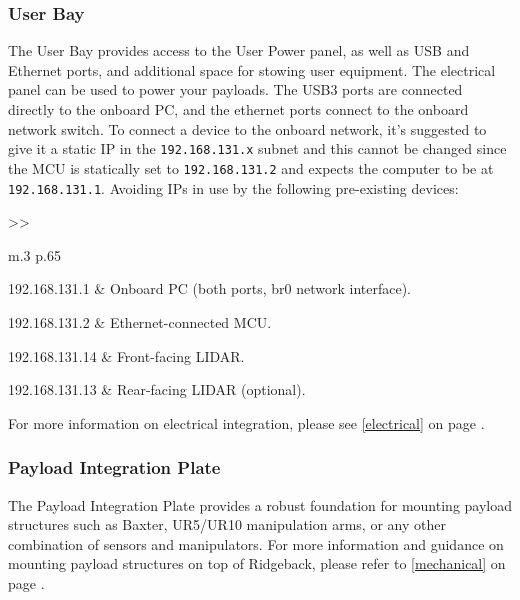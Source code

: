 \documentclass[]{clearpath-latex/clearpath-manual}
\begin{document}
\pagebreak[4]
\subsubsection{User Bay}\label{userbay}

The User Bay provides access to the User Power panel, as well as USB and Ethernet ports, and additional space for stowing user equipment.  The electrical panel can be used to power your payloads. The USB3 ports are connected directly to the onboard PC, and the ethernet ports connect to the onboard network switch. To connect a device to the onboard network, it's suggested to give it a static IP in the \lstinline{192.168.131.x} subnet and this cannot be changed since the MCU is statically set to \lstinline{192.168.131.2} and expects the computer to be at \lstinline{192.168.131.1}.  Avoiding IPs in use by the following pre-existing devices:

\bgroup
\def\arraystretch{1.2}%
\begin{table}[h]
	\centering
	\begin{tabular}{>{}>{\raggedright}m{.3\textwidth} p{.65\textwidth}} \hline

	192.168.131.1 & Onboard PC (both ports, br0 network interface). \\ \hline

	192.168.131.2 & Ethernet-connected MCU. \\ \hline

	192.168.131.14 & Front-facing LIDAR. \\ \hline

	192.168.131.13 & Rear-facing LIDAR (optional). \\ \hline

	\end{tabular}
\newline
\caption{Ridgeback Onboard Network Devices}
\label{netdevs}
\end{table}
\egroup

For more information on electrical integration, please see \autoref{electrical} on page \pageref{electrical}.


\subsubsection{Payload Integration Plate}

The Payload Integration Plate provides a robust foundation for mounting payload structures such as Baxter, UR5/UR10 manipulation arms, or any other combination of sensors and manipulators.   For more information and guidance on mounting payload structures on top of Ridgeback, please refer to \autoref{mechanical} on page \pageref{mechanical}.
\end{document}
